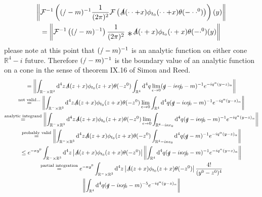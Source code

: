 \documentclass[a4paper,12pt]{article}
\newcommand{\equaltext}[1]{\ensuremath{\stackrel{\text{#1}}{=}}}
\begin{document}
\begin{multline}
\left\|\mathcal{F}^{-1}\left((\slashed{\cdot}-m)^{-1} \frac{1}{(2\pi)^2} \mathcal{F}\left( \slashed{A}(\cdot\cdot+x)\phi_{t_0}(\cdot\cdot+x)\theta(-\cdot\cdot^0)\right)\right)(y)\right\|\\
=\left\|\mathcal{F}^{-1}\left((\slashed{\cdot}-m)^{-1}\right) \frac{1}{(2\pi)^2} \text{ }_{\text{{\Large *}}}\slashed{A}(\cdot+x)\phi_{t_0}(\cdot+x)\theta(-\cdot^0)(y)\right\| \\
\end{multline}
please note at this point that \((\slashed{\cdot}-m)^{-1}\) is an analytic function on either cone \(\mathbb{R}^4 - i \text{ future}\). Therefore \((\slashed{\cdot}-m)^{-1}\) is the boundary value of an analytic function on a cone in the sense of theorem IX.16 of Simon and Reed. 
\begin{multline}  
=\left\|\int_{\mathbb{R}^- \times\mathbb{R}^3}\text{d}^4z \slashed{A}(z+x)\phi_{t_0}(z+x)\theta(-z^0)\int_{\mathbb{R}^4}\text{d}^4q\lim_{\epsilon\rightarrow 0}(\slashed{q}-i\epsilon \slashed{e_0}-m)^{-1} e^{-iq^\alpha(y-z)_\alpha}\right\|\\
\equaltext{not valid...}\left\|\int_{\mathbb{R}^- \times\mathbb{R}^3}\text{d}^4z \slashed{A}(z+x)\phi_{t_0}(z+x)\theta(-z^0)\lim_{\epsilon\rightarrow 0}\int_{\mathbb{R}^4}\text{d}^4q(\slashed{q}-i\epsilon \slashed{e_0}-m)^{-1} e^{-iq^\alpha(y-z)_\alpha}\right\|\\
\equaltext{analytic integrand}\left\|\int_{\mathbb{R}^- \times\mathbb{R}^3}\text{d}^4z \slashed{A}(z+x)\phi_{t_0}(z+x)\theta(-z^0)\lim_{\epsilon\rightarrow 0}\int_{\mathbb{R}^4 -i \kappa e_0}\text{d}^4q(\slashed{q}-i\epsilon \slashed{e_0}-m)^{-1} e^{-iq^\alpha(y-z)_\alpha}\right\|\\
\equaltext{probably valid}\left\|\int_{\mathbb{R}^- \times\mathbb{R}^3}\text{d}^4z \slashed{A}(z+x)\phi_{t_0}(z+x)\theta(-z^0)\int_{\mathbb{R}^4 -i \kappa e_0}\text{d}^4q(\slashed{q}-m)^{-1} e^{-iq^\alpha(y-z)_\alpha}\right\|\\
\le e^{-\kappa y^0} \int_{\mathbb{R}^- \times\mathbb{R}^3}\text{d}^4z \left|\slashed{A}(z+x)\phi_{t_0}(z+x)\theta(-z^0)\right| \left\| \int_{\mathbb{R}^4 }\text{d}^4q(\slashed{q}-i\kappa \slashed{e_0}-m)^{-1} e^{-iq^\alpha(y-z)_\alpha}\right\|\\
\equaltext{partial integration} e^{-\kappa y^0} \int_{\mathbb{R}^- \times\mathbb{R}^3}\text{d}^4z \left|\slashed{A}(z+x)\phi_{t_0}(z+x)\theta(-z^0)\right| \frac{4!}{(y^0-z^0)^4} \\
\left\| \int_{\mathbb{R}^4 }\text{d}^4q(\slashed{q}-i\kappa \slashed{e_0}-m)^{-5} e^{-iq^\alpha(y-z)_\alpha}\right\|\\

\end{multline}
\end{document}
